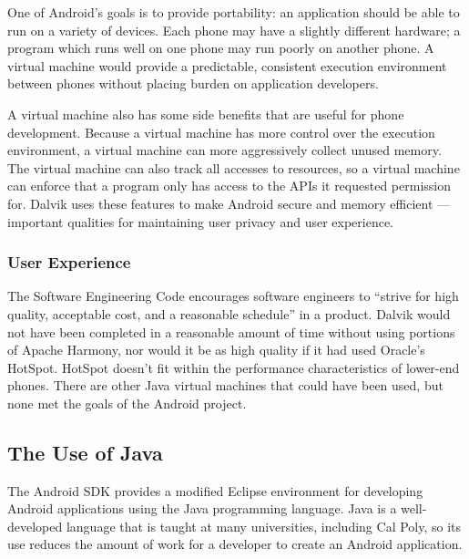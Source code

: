 \documentclass[11pt]{article}
\begin{document}
\begin{multicols}{2}
One of Android's goals is to provide portability: an application should be able
to run on a variety of devices.  Each phone may have a slightly different
hardware; a program which runs well on one phone may run poorly on another
phone.  A virtual machine would provide a predictable, consistent execution
environment between phones without placing burden on application developers.

A virtual machine also has some side benefits that are useful for phone
development.  Because a virtual machine has more control over the execution
environment, a virtual machine can more aggressively collect unused memory.  The
virtual machine can also track all accesses to resources, so a virtual machine
can enforce that a program only has access to the APIs it requested permission
for.  Dalvik uses these features to make Android secure and memory efficient ---
important qualities for maintaining user privacy and user experience.


\subsubsection{User Experience} %
\label{ssub:quality}

The Software Engineering Code \cite{secode} encourages software engineers to
``strive for high quality, acceptable cost, and a reasonable schedule'' in a
product.  Dalvik would not have been completed in a reasonable amount of time
without using portions of Apache Harmony, nor would it be as high quality if it
had used Oracle's HotSpot.  HotSpot doesn't fit within the performance
characteristics of lower-end phones. \cite{dalvik-vm-arch} There are other Java
virtual machines that could have been used, but none met the goals of the
Android project.



\subsection{The Use of Java} %
\label{sub:java}

The Android SDK provides a modified Eclipse environment for developing Android
applications using the Java programming language.  Java is a well-developed
language that is taught at many universities, including Cal Poly, so its use
reduces the amount of work for a developer to create an Android application.


\end{multicols}
\end{document}

